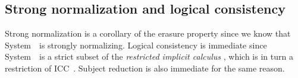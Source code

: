 
\subsection{Strong normalization and logical consistency}
\label{ssec:fi:sn}
Strong normalization is a corollary of the erasure property since we know that
System~\Fw\ is strongly normalizing. Logical consistency is immediate since
System~\Fi\ is a strict subset of the \emph{restricted implicit calculus}
\cite{Miquel00}, which is in turn a restriction of ICC~\cite{Miquel01}.
Subject reduction is also immediate for the same reason.

